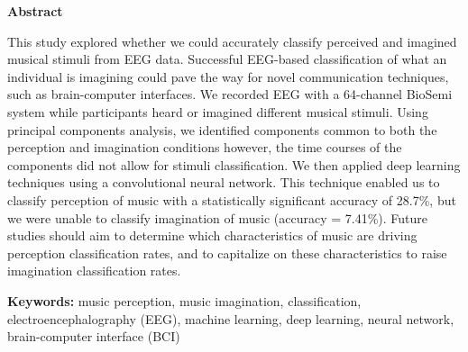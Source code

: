 \begin{preliminary}
\newpage
{}
\Large\begin{center}\textbf{Abstract}\end{center}\normalsize
\begin{spacing}{2}
This study explored whether we could accurately classify perceived and imagined musical stimuli from EEG data. 
Successful EEG-based classification of what an individual is imagining could pave the way for novel communication techniques, such as brain-computer interfaces. 
We recorded EEG with a 64-channel BioSemi system while participants heard or imagined different musical stimuli. 
Using principal components analysis, we identified components common to both the perception and imagination conditions however, the time courses of the components did not allow for stimuli classification. 
We then applied deep learning techniques using a convolutional neural network. 
This technique enabled us to classify perception of music with a statistically significant accuracy of 28.7\%, but we were unable to classify imagination of music (accuracy = 7.41\%). 
Future studies should aim to determine which characteristics of music are driving perception classification rates, and to capitalize on these characteristics to raise imagination classification rates. 
\end{spacing}
\vfill
\textbf{Keywords:} music perception, music imagination, classification, electroencephalography (EEG), machine learning, deep learning, neural network, brain-computer interface (BCI)
\newpage
{}
\acknowledge{\makeacknowledge}	%
\newpage
\tableofcontents
\newpage
{}
\listoftables
\newpage
{}
\listoffigures
\newpage
{}
\listofmyappendices\newpage
\cleardoublepage
\end{preliminary}